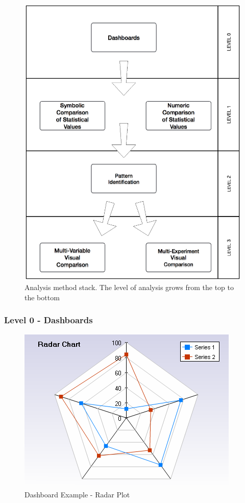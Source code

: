 \begin{figure}[tbh]
  \centering
	\includegraphics[width=\linewidth]{images/analysis-method}
	\caption{Analysis method stack. The level of analysis grows from the top to the bottom} 
  	\label{fig:analysis-method}
\end{figure}

\subsubsection{Level 0 - Dashboards}\label{sec:heaven-level0}

\begin{figure}[tbh]
  \centering
	\includegraphics[width=\linewidth]{images/radar}
	\caption{Dashboard Example - Radar Plot} 
  	\label{fig:analysis-method}
\end{figure}

